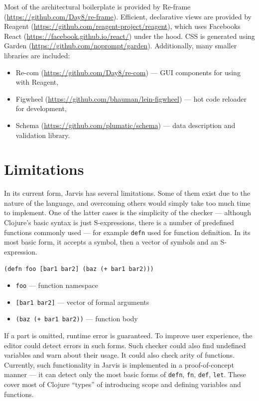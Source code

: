 \documentclass[english,mgr,shortabstract]{iithesis}
\begin{document}
Most of the architectural boilerplate is provided by Re-frame
(\url{https://github.com/Day8/re-frame}).
Efficient, declarative views are provided by Reagent
(\url{https://github.com/reagent-project/reagent}), which uses Facebooks React
(\url{https://facebook.github.io/react/}) under the hood.
CSS is generated using Garden (\url{https://github.com/noprompt/garden}).
Additionally, many smaller libraries are included:
\begin{itemize}
  \item Re-com (\url{https://github.com/Day8/re-com}) --- GUI components for using with
    Reagent,
    
  \item Figwheel (\url{https://github.com/bhauman/lein-figwheel}) --- hot code
    reloader for development,
    
  \item Schema (\url{https://github.com/plumatic/schema}) --- data description and
    validation library.
    
\end{itemize}

\section{Limitations}
In its current form, Jarvis has several limitations.
Some of them exist due to the nature of the language, and overcoming others
would simply take too much time to implement.
One of the latter cases is the simplicity of the checker --- although Clojure’s
basic syntax is just S-expressions, there is a number of predefined functions
commonly used --- for example \lstinline|defn| used for function definition.
In its most basic form, it accepts a symbol, then a vector of symbols and an
S-expression.

\vspace{5mm}
\texttt{(defn \colorbox{blue!30}{foo} \colorbox{green!20}{[bar1 bar2]} \colorbox{red!10}{(baz (+ bar1 bar2))})}
\begin{itemize}
  \item \texttt{\colorbox{blue!30}{foo}} --- function namespace
  \item \texttt{\colorbox{green!20}{[bar1 bar2]}} --- vector of formal arguments
  \item \texttt{\colorbox{red!10}{(baz (+ bar1 bar2))}} --- function body
\end{itemize}
\vspace{5mm}

If a part is omitted, runtime error is guaranteed.
To improve user experience, the editor could detect errors in such forms.
Such checker could also find undefined variables and warn about their usage.
It could also check arity of functions.
Currently, such functionality in Jarvis is implemented in a proof-of-concept
manner --- it can detect only the most basic forms of \lstinline|defn|,
\lstinline|fn|, \lstinline|def|, \lstinline|let|. These cover most of Clojure
“types” of introducing scope and defining variables and functions.
\end{document}
